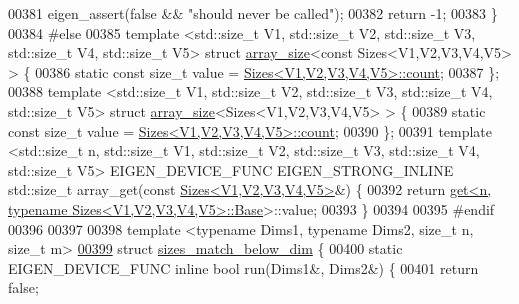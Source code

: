 \begin{DoxyCode}
00381   eigen\_assert(\textcolor{keyword}{false} && \textcolor{stringliteral}{"should never be called"});
00382   \textcolor{keywordflow}{return} -1;
00383 \}
00384 \textcolor{preprocessor}{#else}
00385 \textcolor{keyword}{template} <std::\textcolor{keywordtype}{size\_t} V1, std::\textcolor{keywordtype}{size\_t} V2, std::\textcolor{keywordtype}{size\_t} V3, std::\textcolor{keywordtype}{size\_t} V4, std::\textcolor{keywordtype}{size\_t} V5> \textcolor{keyword}{struct }
      \hyperlink{struct_eigen_1_1internal_1_1array__size}{array\_size}<const Sizes<V1,V2,V3,V4,V5> > \{
00386   \textcolor{keyword}{static} \textcolor{keyword}{const} \textcolor{keywordtype}{size\_t} value = \hyperlink{struct_eigen_1_1_sizes}{Sizes<V1,V2,V3,V4,V5>::count};
00387 \};
00388 \textcolor{keyword}{template} <std::\textcolor{keywordtype}{size\_t} V1, std::\textcolor{keywordtype}{size\_t} V2, std::\textcolor{keywordtype}{size\_t} V3, std::\textcolor{keywordtype}{size\_t} V4, std::\textcolor{keywordtype}{size\_t} V5> \textcolor{keyword}{struct }
      \hyperlink{struct_eigen_1_1internal_1_1array__size}{array\_size}<Sizes<V1,V2,V3,V4,V5> > \{
00389   \textcolor{keyword}{static} \textcolor{keyword}{const} \textcolor{keywordtype}{size\_t} value = \hyperlink{struct_eigen_1_1_sizes}{Sizes<V1,V2,V3,V4,V5>::count};
00390 \};
00391 \textcolor{keyword}{template} <std::\textcolor{keywordtype}{size\_t} n, std::\textcolor{keywordtype}{size\_t} V1, std::\textcolor{keywordtype}{size\_t} V2, std::\textcolor{keywordtype}{size\_t} V3, std::\textcolor{keywordtype}{size\_t} V4, std::\textcolor{keywordtype}{size\_t} V5> 
      EIGEN\_DEVICE\_FUNC EIGEN\_STRONG\_INLINE std::size\_t array\_get(\textcolor{keyword}{const} 
      \hyperlink{struct_eigen_1_1_sizes}{Sizes<V1,V2,V3,V4,V5>}&) \{
00392   \textcolor{keywordflow}{return} \hyperlink{struct_eigen_1_1internal_1_1get}{get<n, typename Sizes<V1,V2,V3,V4,V5>::Base}>::value;
00393 \}
00394 
00395 \textcolor{preprocessor}{#endif}
00396 
00397 
00398 \textcolor{keyword}{template} <\textcolor{keyword}{typename} Dims1, \textcolor{keyword}{typename} Dims2, \textcolor{keywordtype}{size\_t} n, \textcolor{keywordtype}{size\_t} m>
\hyperlink{struct_eigen_1_1internal_1_1sizes__match__below__dim}{00399} \textcolor{keyword}{struct }\hyperlink{struct_eigen_1_1internal_1_1sizes__match__below__dim}{sizes\_match\_below\_dim} \{
00400   \textcolor{keyword}{static} EIGEN\_DEVICE\_FUNC  \textcolor{keyword}{inline} \textcolor{keywordtype}{bool} run(Dims1&, Dims2&) \{
00401     \textcolor{keywordflow}{return} \textcolor{keyword}{false};

\end{DoxyCode}

